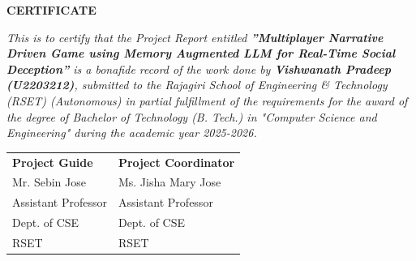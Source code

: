 	\newpage
	\thispagestyle{empty}
	\vspace{1cm}
	\begin{center}
	
		\large \bfseries{\huge{CERTIFICATE}}\\[1cm]
	\end{center}
	
	\renewcommand{\baselinestretch}{1.2}\normalsize
	
	\emph{This is to certify that the Project Report entitled \textbf{”Multiplayer Narrative Driven Game using Memory
Augmented LLM for Real-Time Social Deception”} is a bonafide record of the work done by 
\textbf{Vishwanath Pradeep (U2203212)}, 
submitted to the Rajagiri School of Engineering \& Technology (RSET) (Autonomous) in partial fulfillment of the requirements for the award of the degree of Bachelor of Technology (B. Tech.) in "Computer Science and Engineering" during the academic year 2025-2026.}\\[2.5cm]
	
\begin{flushleft}
	
	
	\begin{longtable}{p{10.8cm} p{10.8cm}}
        {\textbf{Project Guide}} &  {\textbf{Project Coordinator}}\\
		{Mr. Sebin Jose} & {Ms. Jisha Mary Jose}\\
		{Assistant Professor} & {Assistant Professor}\\
		{Dept. of CSE} & {Dept. of CSE}\\
		{RSET} & {RSET} \\
		
	\end{longtable}
\end{flushleft}
	
